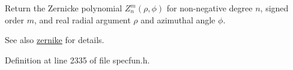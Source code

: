 Return the Zernicke polynomial $ Z_n^m(\rho,\phi) $ for non-\/negative degree $ n $, signed order $ m $, and real radial argument $ \rho $ and azimuthal angle $ \phi $.

\begin{DoxySeeAlso}{See also}
\hyperlink{group__gnu__math__spec__func_gaaed33f29c1eb1d2c5b9590fe2e57151c}{zernike} for details. 
\end{DoxySeeAlso}


Definition at line 2335 of file specfun.\+h.

